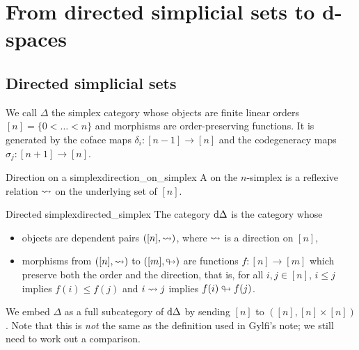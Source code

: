 \section{From directed simplicial sets to d-spaces}

\subsection{Directed simplicial sets}

We call \( \Delta \) the simplex category whose objects are finite linear orders \( [n] = \{0 < \dots < n\} \) and morphisms are order-preserving functions.
It is generated by the coface maps \( \delta_i\colon [n-1] \to [n] \) and the codegeneracy maps \( \sigma_j\colon [n+1] \to [n] \).

\begin{cdef}{Direction on a simplex}{direction_on_simplex}
	A  on the \( n \)-simplex is a reflexive relation \( \rightsquigarrow \) on the underlying set of \( [n] \).
\end{cdef}

\begin{cdef}{Directed simplex}{directed_simplex}
	The  category \( \mathrm{d}\Delta \) is the category whose
	\begin{itemize}
		\item objects are dependent pairs \( ([n], \rightsquigarrow) \), where \( \rightsquigarrow \) is a direction on \( [n] \),
		\item morphisms from \( ([n], \rightsquigarrow) \) to \( ([m], \looparrowright) \) are functions \( f\colon [n] \to [m] \) which preserve both the order and the direction, that is, for all \( i, j \in [n] \), \( i \leq j \) implies \( f(i) \leq f(j) \) and \( i \rightsquigarrow j \) implies \( f(i) \looparrowright f(j) \). 
	\end{itemize}
\end{cdef}
We embed \( \Delta \) as a full subcategory of \( \mathrm{d}\Delta \) by sending \( [n] \) to \( ([n], [n] \times [n]) \).
Note that this is \emph{not} the same as the definition used in Gylfi's note; we still need to work out a comparison.

